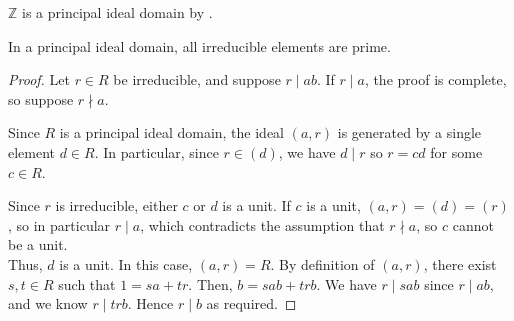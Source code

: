 \begin{example}
	$\mathbb Z$ is a principal ideal domain by .
\end{example}

\begin{proposition} \label{prp:10.3}
	In a principal ideal domain, all irreducible elements are prime.
\end{proposition}

\begin{proof}
	Let $r \in R$ be irreducible, and suppose $r \mid ab$.
	If $r \mid a$, the proof is complete, so suppose $r \nmid a$.

	Since $R$ is a principal ideal domain, the ideal $(a,r)$ is generated by a single element $d \in R$.
	In particular, since $r \in (d)$, we have $d \mid r$ so $r = cd$ for some $c \in R$.

	Since $r$ is irreducible, either $c$ or $d$ is a unit.
	If $c$ is a unit, $(a,r) = (d) = (r)$, so in particular $r \mid a$, which contradicts the assumption that $r \nmid a$, so $c$ cannot be a unit. \\
	Thus, $d$ is a unit.
	In this case, $(a,r) = R$.
	By definition of $(a,r)$, there exist $s, t \in R$ such that $1 = sa + tr$.
	Then, $b = sab + trb$.
	We have $r \mid sab$ since $r \mid ab$, and we know $r \mid trb$.
	Hence $r \mid b$ as required.
\end{proof}

